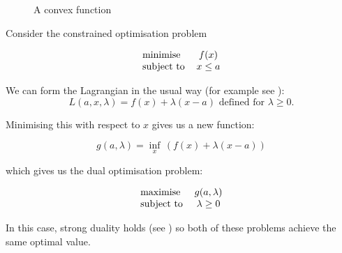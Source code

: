 \documentclass[10pt]{article}
\begin{document}
\begin{figure}
\centering
{}
\caption{A convex function}
\label{convex}
\end{figure}
Consider the constrained optimisation problem

\[
\begin{tabular}{l c}
minimise & $f(x)$ \\
subject to & $x\le a$ \\
\end{tabular}
\]

We can form the Lagrangian in the usual way (for example see \cite{boyd}):
\[
L(a,x,\lambda) = f(x)+\lambda(x-a) \mbox{ defined for $\lambda\ge 0$}.
\]

Minimising this with respect to $x$ gives us a new function:

\[
g(a,\lambda) = \inf_x\, (f(x)+\lambda(x-a))
\]

which gives us the dual optimisation problem:

\[
\begin{tabular}{l c}
maximise & $g(a,\lambda)$ \\
subject to & $\lambda\ge 0$ \\
\end{tabular}
\]

In this case, strong duality holds (see \cite{strong}) so both of these problems achieve the same optimal value.
\end{document}
